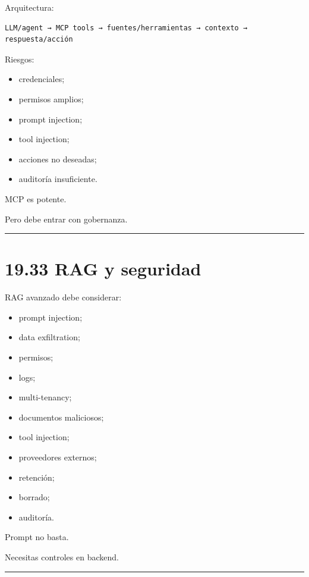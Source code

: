 Arquitectura:

\begin{lstlisting}
LLM/agent → MCP tools → fuentes/herramientas → contexto → respuesta/acción
\end{lstlisting}

Riesgos:

\begin{itemize}
\tightlist
\item
  credenciales;
\item
  permisos amplios;
\item
  prompt injection;
\item
  tool injection;
\item
  acciones no deseadas;
\item
  auditoría insuficiente.
\end{itemize}

MCP es potente.

Pero debe entrar con gobernanza.

\begin{center}\rule{0.5\linewidth}{0.5pt}\end{center}

\section{19.33 RAG y seguridad}\label{rag-y-seguridad}

RAG avanzado debe considerar:

\begin{itemize}
\tightlist
\item
  prompt injection;
\item
  data exfiltration;
\item
  permisos;
\item
  logs;
\item
  multi-tenancy;
\item
  documentos maliciosos;
\item
  tool injection;
\item
  proveedores externos;
\item
  retención;
\item
  borrado;
\item
  auditoría.
\end{itemize}

Prompt no basta.

Necesitas controles en backend.

\begin{center}\rule{0.5\linewidth}{0.5pt}\end{center}

